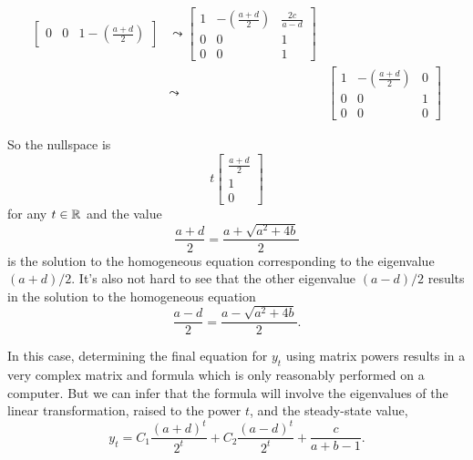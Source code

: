 \documentclass[MathsNotesBase.tex]{subfiles}
\begin{document}
{\begin{align*}
\begin{bmatrix}
			0   &  0 & 1-(\frac{a + d}{2})	
		\end{bmatrix} &\leadsto 
		\begin{bmatrix}
			1   & -(\frac{a + d}{2}) & \frac{2c}{a - d} \\[4pt]
			0   &  0 & 1 \\[4pt]
			0   &  0 & 1	
		\end{bmatrix}  \\[4pt]
		&\leadsto &
		\begin{bmatrix}
			1   & -(\frac{a + d}{2}) & 0 \\[4pt]
			0   &  0 & 1 \\[4pt]
			0   &  0 & 0
		\end{bmatrix}
		\end{align*}
		
		So the nullspace is
		\[ t\begin{bmatrix}
				\frac{a + d}{2} \\[4pt] 1 \\[4pt] 0	
			\end{bmatrix} 
		\]
		for any ${ t \in \mathbb{R}^{} }$ and the value
		\[ \frac{a + d}{2} = \frac{a + \sqrt{a^2 + 4b}}{2} \]
		is the solution to the homogeneous equation corresponding to the eigenvalue ${ (a+d)/2 }$. It's also not hard to see that the other eigenvalue ${ (a-d)/2 }$ results in the solution to the homogeneous equation
		\[ \frac{a - d}{2} = \frac{a - \sqrt{a^2 + 4b}}{2}. \]
		
		\medskip
	
		\medskip
		In this case, determining the final equation for ${ y_t }$ using matrix powers results in a very complex matrix and formula which is only reasonably performed on a computer. But we can infer that the formula will involve the eigenvalues of the linear transformation, raised to the power $t$, and the steady-state value,
		\[ y_t = C_1 \frac{(a+d)^t}{2^t} + C_2 \frac{(a-d)^t}{2^t} + \frac{c}{a+b-1}. \]
		
}
\end{document}
